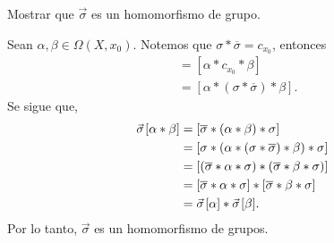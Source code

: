 \begin{ejercicio}
        Mostrar que $\Vec{\sigma}$ es un homomorfismo de grupo.
    \end{ejercicio}

\begin{demostracion}
Sean $\alpha,\beta\in \Omega(X,x_0)$. Notemos que $\sigma*\overline{\sigma}=c_{x_0}$, entonces 
\begin{align*}
    [\alpha*\beta]&=[\alpha*c_{x_0}*\beta]\\
    &=[\alpha*(\sigma*\overline{\sigma})*\beta].
\end{align*}
Se sigue que,
\begin{align*}
    \Vec{\sigma}\hspace{0.35mm}[\alpha*\beta]&=[\overline{\sigma}*(\alpha*\beta)*\sigma]\\
    &=[\sigma*(\alpha*(\sigma*\overline{\sigma})*\beta)*\sigma]\\
    &=[(\overline{\sigma}*\alpha*\sigma)*(\overline{\sigma}*\beta*\sigma)]\\
    &=[\overline{\sigma}*\alpha*\sigma]*[\overline{\sigma}*\beta*\sigma]\\
    &=\Vec{\sigma}\hspace{0.35mm}[\alpha]*\Vec{\sigma}\hspace{0.35mm}[\beta].
\end{align*}
Por lo tanto, $\Vec{\sigma}$ es un homomorfismo de grupos.
\end{demostracion}
